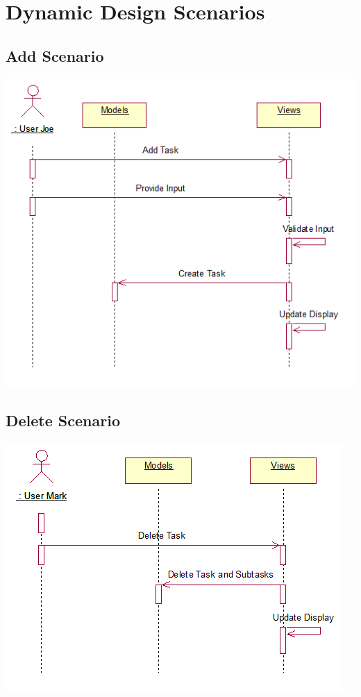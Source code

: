 \section{Dynamic Design Scenarios}

\subsection{Add Scenario}
\includegraphics{diagrams/add_sequence_diagram.png}


\subsection{Delete Scenario}
\includegraphics{diagrams/delete_sequence_diagram.png}

